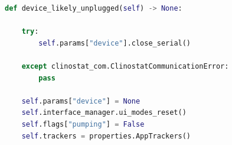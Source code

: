 \begin{lstlisting}[language=Python,caption={Metoda wykrywająca odłączone urządzenie.}]
def device_likely_unplugged(self) -> None:

	try:
		self.params["device"].close_serial()
		
	except clinostat_com.ClinostatCommunicationError:
		pass
		
	self.params["device"] = None
	self.interface_manager.ui_modes_reset()
	self.flags["pumping"] = False
	self.trackers = properties.AppTrackers()
\end{lstlisting}